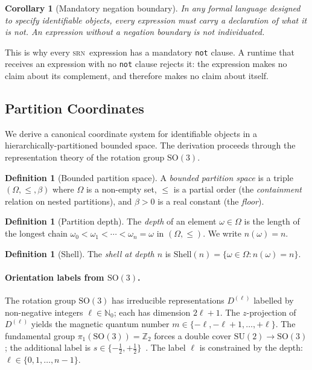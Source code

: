 \documentclass[twocolumn,11pt,a4paper]{article}
\newtheorem{corollary}[theorem]{Corollary}
\theoremstyle{definition}
\newtheorem{definition}[theorem]{Definition}
\theoremstyle{remark}
\newcommand{\srn}{\textsc{srn}}
\begin{document}
\begin{corollary}[Mandatory negation boundary]
\label{cor:boundary}
In any formal language designed to specify identifiable objects, every
expression must carry a declaration of what it is \emph{not}.  An
expression without a negation boundary is not individuated.
\end{corollary}

This is why every \srn\ expression has a mandatory \lstinline|not|
clause.  A runtime that receives an expression with no
\lstinline|not| clause rejects it: the expression makes no claim about
its complement, and therefore makes no claim about itself.

\subsection{Partition Coordinates}
\label{sec:partcoord}

We derive a canonical coordinate system for identifiable objects in a
hierarchically-partitioned bounded space.  The derivation proceeds
through the representation theory of the rotation group $\mathrm{SO}(3)$.

\begin{definition}[Bounded partition space]
A \emph{bounded partition space} is a triple $(\Omega, \leq, \beta)$
where $\Omega$ is a non-empty set, $\leq$ is a partial order (the
\emph{containment} relation on nested partitions), and $\beta > 0$
is a real constant (the \emph{floor}).
\end{definition}

\begin{definition}[Partition depth]
The \emph{depth} of an element $\omega \in \Omega$ is the length
of the longest chain $\omega_0 < \omega_1 < \cdots < \omega_n = \omega$
in $(\Omega, \leq)$.  We write $n(\omega) = n$.
\end{definition}

\begin{definition}[Shell]
The \emph{shell at depth $n$} is $\mathrm{Shell}(n) =
\{\omega \in \Omega : n(\omega) = n\}$.
\end{definition}

\paragraph{Orientation labels from $\mathrm{SO}(3)$.}
The rotation group $\mathrm{SO}(3)$ has irreducible representations
$D^{(\ell)}$ labelled by non-negative integers $\ell \in \mathbb{N}_0$;
each has dimension $2\ell + 1$.  The $z$-projection of
$D^{(\ell)}$ yields the magnetic quantum number $m \in
\{-\ell, -\ell+1, \ldots, +\ell\}$.  The fundamental group
$\pi_1(\mathrm{SO}(3)) = \mathbb{Z}_2$ forces a double cover
$\mathrm{SU}(2) \to \mathrm{SO}(3)$; the additional label is $s \in
\{-\tfrac{1}{2}, +\tfrac{1}{2}\}$~\cite{hall2015lie}.  The label
$\ell$ is constrained by the depth: $\ell \in \{0, 1, \ldots, n-1\}$.
\end{document}
